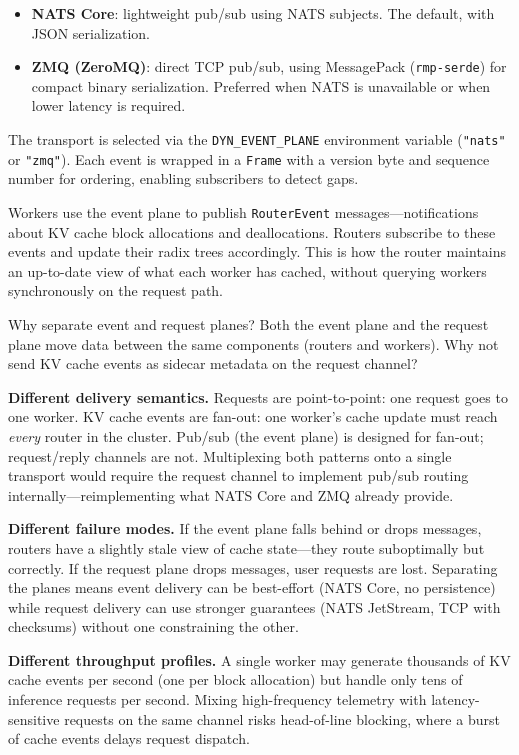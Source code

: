 \begin{itemize}
  \item \textbf{NATS Core}: lightweight pub/sub using NATS subjects. The default, with JSON serialization.
  \item \textbf{ZMQ (ZeroMQ)}: direct TCP pub/sub, using MessagePack (\texttt{rmp-serde}) for compact binary serialization. Preferred when NATS is unavailable or when lower latency is required.
\end{itemize}

The transport is selected via the \texttt{DYN\_EVENT\_PLANE} environment variable (\texttt{"nats"} or \texttt{"zmq"}). Each event is wrapped in a \texttt{Frame} with a version byte and sequence number for ordering, enabling subscribers to detect gaps.

Workers use the event plane to publish \texttt{RouterEvent} messages---notifications about KV cache block allocations and deallocations. Routers subscribe to these events and update their radix trees accordingly. This is how the router maintains an up-to-date view of what each worker has cached, without querying workers synchronously on the request path.

\begin{whynotbox}{Why separate event and request planes?}
Both the event plane and the request plane move data between the same components (routers and workers). Why not send KV cache events as sidecar metadata on the request channel?

\textbf{Different delivery semantics.} Requests are point-to-point: one request goes to one worker. KV cache events are fan-out: one worker's cache update must reach \emph{every} router in the cluster. Pub/sub (the event plane) is designed for fan-out; request/reply channels are not. Multiplexing both patterns onto a single transport would require the request channel to implement pub/sub routing internally---reimplementing what NATS Core and ZMQ already provide.

\textbf{Different failure modes.} If the event plane falls behind or drops messages, routers have a slightly stale view of cache state---they route suboptimally but correctly. If the request plane drops messages, user requests are lost. Separating the planes means event delivery can be best-effort (NATS Core, no persistence) while request delivery can use stronger guarantees (NATS JetStream, TCP with checksums) without one constraining the other.

\textbf{Different throughput profiles.} A single worker may generate thousands of KV cache events per second (one per block allocation) but handle only tens of inference requests per second. Mixing high-frequency telemetry with latency-sensitive requests on the same channel risks head-of-line blocking, where a burst of cache events delays request dispatch.
\end{whynotbox}

